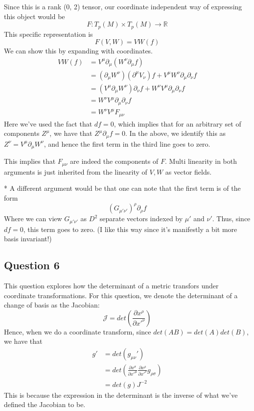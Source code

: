 \documentclass[11pt, a4paper]{article}   	%
\theoremstyle{slplain}
\begin{document}
Since this is a rank (0, 2) tensor, our coordinate independent way of expressing this object would be 
\[ 
F: T_p( M ) \times T_p ( M ) \rightarrow \mathbb{R}
\] 
This specific representation is 
\[ 
F(V, W) = VW(f) 
\] 
We can show this by expanding with coordinates. 
\begin{align*} 
VW(f)  &= V^\mu \partial_\mu ( W^\nu \partial_\mu f ) \\
&= (\partial_\mu W^\nu)( \partial^\mu V_\nu )f + V^\mu W^\nu \partial_\mu \partial_\nu f \\
&= (V^\mu \partial_\mu W^\nu) \partial_\nu f + W^\nu V^\mu \partial_\mu \partial_\nu f \\
&= W^\nu V^\mu \partial_\mu \partial_\nu f \\
&= W^\nu V^\mu F_{\mu \nu}
\end{align*} Here we've used the fact that $df=0$, which implies that for an arbitrary set of components $Z^\mu$, we have that $Z^\mu \partial_\mu f = 0 $. In the above, we identify this as $Z^\nu = V^\mu \partial_\mu W^\nu$, and hence the first term in the third line goes to zero.  

This implies that $F_{\mu \nu}$ are indeed the components of $F$. Multi linearity in both arguments is just inherited 
from the linearity of $ V , W $ as vector fields. 

* 
A different argument would be that one can note that the first term is of the form 
\[
( G_{ \mu' \nu' })^\rho \partial _\rho f  
\] Where we can view $ G_{\mu' \nu' } $ as $D ^ 2 $ separate vectors indexed by $ \mu' $ and $ \nu' $. 
Thus, since  $df = 0 $, this term goes to zero. (I like this way since it's manifestly 
a bit more basis invariant!) 

\pagebreak

\subsection{Question 6} 
This question explores how the determinant of a metric transfors under coordinate transformations. For this question, we denote the determinant of a change of basis as the Jacobian: 
\[ 
\mathcal{ J } = det \left( \frac{ \partial x^\rho }{ \partial x'^\nu } \right) 
\]  
Hence, when we do a coordinate transform, since $det( AB ) = det( A ) det( B) $, we have that
\begin{align*} 
g' &= det (g_{ \mu \nu }' ) \\
&= det \left( \frac{ \partial x^\sigma}{ \partial x'^\mu } \frac{ \partial x^\rho }{ \partial x'^\nu } g_{ \rho \sigma } \right) \\
&= det(g) J^{ -2 } 
\end{align*} 
This is because the expression in the determinant is the inverse of what we've defined the Jacobian to be.
\end{document}
